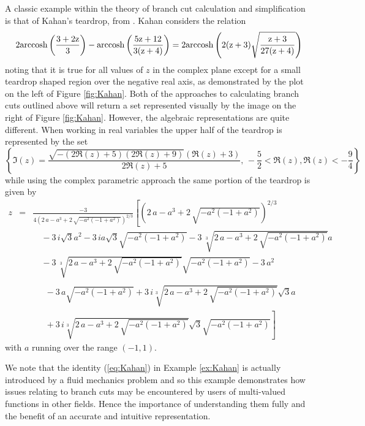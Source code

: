 \documentclass{llncs}
\begin{document}
\begin{example}
\label{ex:Kahan}
A classic example within the theory of branch cut calculation and simplification is that of Kahan's teardrop, from \cite{Kahan87}.  Kahan considers the relation
\begin{equation}
\label{eq:Kahan}
2\rm{arccosh}\left(\frac{3+2z}3\right)-\rm{arccosh}\left(\frac{5z+12}{3(z+4)}\right)= 2\rm{arccosh}\left(2(z+3)\sqrt{\frac{z+3}{27(z+4)}}\right)
\end{equation}
noting that it is true for all values of $z$ in the complex plane except for a small teardrop shaped region over the negative real axis, as demonstrated by the plot on the left of Figure \ref{fig:Kahan}.  Both of the approaches to calculating branch cuts outlined above will return a set represented visually by the image on the right of Figure \ref{fig:Kahan}.  However, the algebraic representations are quite different.  When working in real variables the upper half of the teardrop is represented by the set
\[
\left\{ \Im(z) = \frac{ \sqrt{-(2\Re(z)+5)(2\Re(z)+9)}(\Re(z)+3) }{2\Re(z)+5}, \, -\frac{5}{2} < \Re(z), \Re(z) < -\frac{9}{4} \right\}
\]
while using the complex parametric approach the same portion of the teardrop is given by  
\begin{eqnarray*}
z &=& \frac{-3}{4\left( 2\,a-{a}^{3}+2\,\sqrt {-{a}^{2} \left( -1+{a}^{2} \right) }  \right) ^{2/3}}
\left[ \left( 2\,a-{a}^{3}+2\,\sqrt {-{a}^{2} \left( -1+{a}^{2} \right) } \right) ^{2/3} \right. \\
& & \quad 
-3\,i\sqrt {3}{a}^{2}  -3\,ia\sqrt {3}\sqrt {-{a}^{2} \left( -1+{a}^{2} \right) }
-3\,\sqrt [3]{2\,a-{a}^{3}+2\,\sqrt {-{a}^{2} \left( -1+{a}^{2} \right) }}a \\
& & \quad -3\,\sqrt [3]{2\,a-{a}^{3}+2\,
\sqrt {-{a}^{2} \left( -1+{a}^{2} \right) }}\sqrt {-{a}^{2} \left( -1+{a}^{2} \right) }-3\,{a}^{2}
\\
\end{eqnarray*}
\begin{eqnarray*}
& & \quad -3\,a\sqrt {-{a}^{2} \left( -1+{a}^{2} \right) }
+3\,i\sqrt [3]{2\,a-{a}^{3}+2\,\sqrt {-{a}^{2} \left( -1+{a}^{2} \right) }}\sqrt {3}a\\
& & \left. \quad +3\,i\sqrt [3]{2\,a-{a}^{3}+2\,\sqrt {-{a}^{2} \left( -1+{a}^{2} \right) }}\sqrt {3}\sqrt {-{a}^{2} \left( -1+{a}^{2} \right)  } \right]
\end{eqnarray*}
with $a$ running over the range $(-1,1)$.  
\end{example}

We note that the identity (\ref{eq:Kahan}) in Example \ref{ex:Kahan} is actually introduced by a fluid mechanics problem and so this example demonstrates how issues relating to branch cuts may be encountered by users of multi-valued functions in other fields.  Hence the importance of understanding them fully and the benefit of an accurate and intuitive representation.
\end{document}
